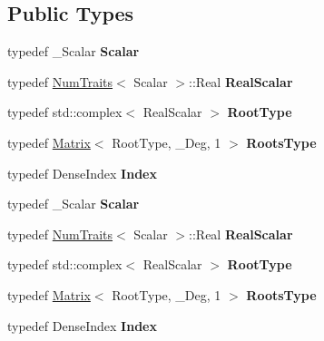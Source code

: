 \subsection*{Public Types}
\begin{DoxyCompactItemize}
\item 
\mbox{\label{class_eigen_1_1_polynomial_solver_base_a4e1ecec51eb82a3f67779ecbb2afff6d}} 
typedef \+\_\+\+Scalar {\bfseries Scalar}
\item 
\mbox{\label{class_eigen_1_1_polynomial_solver_base_a9843dd08dc5307dc0ca3ff83ba4f2f3b}} 
typedef \hyperlink{group___core___module_struct_eigen_1_1_num_traits}{Num\+Traits}$<$ Scalar $>$\+::Real {\bfseries Real\+Scalar}
\item 
\mbox{\label{class_eigen_1_1_polynomial_solver_base_a3777abe4213992f39796dd27aca317e7}} 
typedef std\+::complex$<$ Real\+Scalar $>$ {\bfseries Root\+Type}
\item 
\mbox{\label{class_eigen_1_1_polynomial_solver_base_a58e92e345c17dc86602f6cc35e99c6a7}} 
typedef \hyperlink{group___core___module_class_eigen_1_1_matrix}{Matrix}$<$ Root\+Type, \+\_\+\+Deg, 1 $>$ {\bfseries Roots\+Type}
\item 
\mbox{\label{class_eigen_1_1_polynomial_solver_base_a53afe1e776f154b1523de595bac8d8a5}} 
typedef Dense\+Index {\bfseries Index}
\item 
\mbox{\label{class_eigen_1_1_polynomial_solver_base_a4e1ecec51eb82a3f67779ecbb2afff6d}} 
typedef \+\_\+\+Scalar {\bfseries Scalar}
\item 
\mbox{\label{class_eigen_1_1_polynomial_solver_base_a9843dd08dc5307dc0ca3ff83ba4f2f3b}} 
typedef \hyperlink{group___core___module_struct_eigen_1_1_num_traits}{Num\+Traits}$<$ Scalar $>$\+::Real {\bfseries Real\+Scalar}
\item 
\mbox{\label{class_eigen_1_1_polynomial_solver_base_a3777abe4213992f39796dd27aca317e7}} 
typedef std\+::complex$<$ Real\+Scalar $>$ {\bfseries Root\+Type}
\item 
\mbox{\label{class_eigen_1_1_polynomial_solver_base_a58e92e345c17dc86602f6cc35e99c6a7}} 
typedef \hyperlink{group___core___module_class_eigen_1_1_matrix}{Matrix}$<$ Root\+Type, \+\_\+\+Deg, 1 $>$ {\bfseries Roots\+Type}
\item 
\mbox{\label{class_eigen_1_1_polynomial_solver_base_a53afe1e776f154b1523de595bac8d8a5}} 
typedef Dense\+Index {\bfseries Index}
\end{DoxyCompactItemize}
